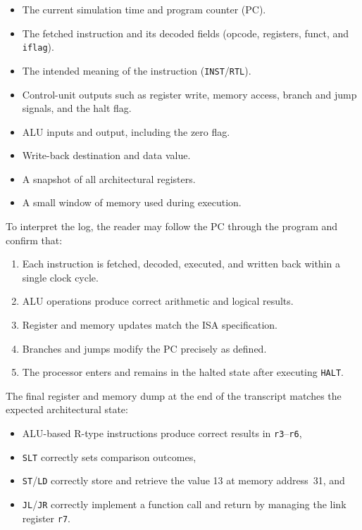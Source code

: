 \documentclass[12pt]{report}
\begin{document}
\begin{itemize}
    \item The current simulation time and program counter (PC).
    \item The fetched instruction and its decoded fields (opcode, registers,
          funct, and \texttt{iflag}).
    \item The intended meaning of the instruction (\texttt{INST}/\texttt{RTL}).
    \item Control-unit outputs such as register write, memory access, branch and
          jump signals, and the halt flag.
    \item ALU inputs and output, including the zero flag.
    \item Write-back destination and data value.
    \item A snapshot of all architectural registers.
    \item A small window of memory used during execution.
\end{itemize}

To interpret the log, the reader may follow the PC through the program and
confirm that:

\begin{enumerate}
    \item Each instruction is fetched, decoded, executed, and written back
          within a single clock cycle.
    \item ALU operations produce correct arithmetic and logical results.
    \item Register and memory updates match the ISA specification.
    \item Branches and jumps modify the PC precisely as defined.
    \item The processor enters and remains in the halted state after executing
          \texttt{HALT}.
\end{enumerate}

The final register and memory dump at the end of the transcript matches the
expected architectural state:

\begin{itemize}
    \item ALU-based R-type instructions produce correct results in
          \texttt{r3}--\texttt{r6},
    \item \texttt{SLT} correctly sets comparison outcomes,
    \item \texttt{ST}/\texttt{LD} correctly store and retrieve the value 13 at
          memory address~31, and
    \item \texttt{JL}/\texttt{JR} correctly implement a function call and return
          by managing the link register \texttt{r7}.
\end{itemize}
\end{document}
